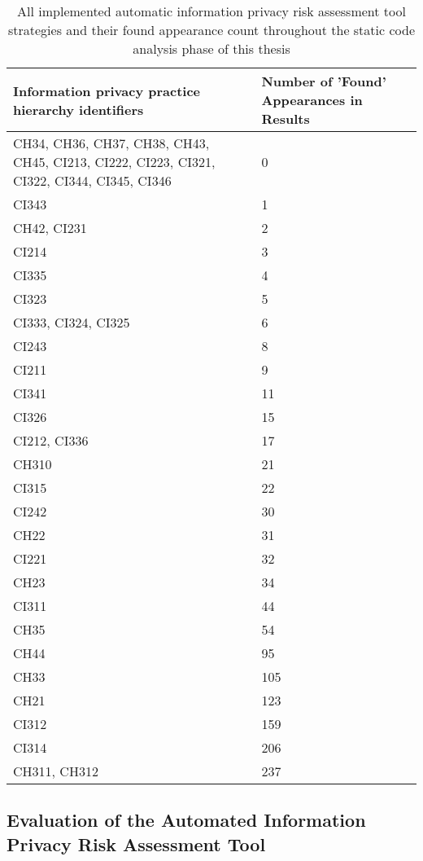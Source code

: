 \begin{table}[]
\centering
\begin{tabular}{|p{8cm}|p{6cm}|}
\hline
\textbf{Information privacy practice hierarchy identifiers}  & \textbf{Number of 'Found' Appearances in Results} \\ \hline
CH34, CH36, CH37, CH38, CH43, CH45, CI213, CI222, CI223, CI321, CI322, CI344, CI345, CI346  & 0   \\ \hline
CI343 & 1   \\ \hline
CH42, CI231  & 2   \\ \hline
CI214 & 3   \\ \hline
CI335 & 4   \\ \hline
CI323 & 5   \\ \hline
CI333, CI324, CI325 & 6   \\ \hline
CI243 & 8   \\ \hline
CI211 & 9   \\ \hline
CI341 & 11  \\ \hline
CI326 & 15  \\ \hline
CI212, CI336 & 17  \\ \hline
CH310 & 21  \\ \hline
CI315 & 22  \\ \hline
CI242 & 30  \\ \hline
CH22  & 31  \\ \hline
CI221 & 32  \\ \hline
CH23  & 34  \\ \hline
CI311 & 44  \\ \hline
CH35  & 54  \\ \hline
CH44  & 95  \\ \hline
CH33  & 105 \\ \hline
CH21  & 123 \\ \hline
CI312 & 159 \\ \hline
CI314 & 206 \\ \hline
CH311, CH312 & 237 \\ \hline
\end{tabular}
\caption{All implemented automatic information privacy risk assessment tool strategies and their found appearance count throughout the static code analysis phase of this thesis}
\label{table:strategyResults}
\end{table}

\subsection{Evaluation of the Automated Information Privacy Risk Assessment Tool}

